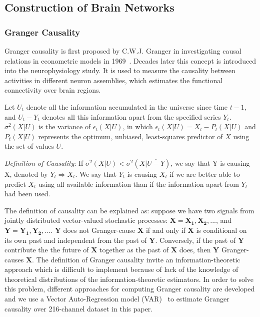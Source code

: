 \subsection{Construction of Brain Networks}
\subsubsection{Granger Causality}
Granger causality is first proposed by C.W.J. Granger in investigating causal relations in econometric models in 1969~\cite{granger1969investigating}. Decades later this concept is introduced into the neurophysiology study. It is used to measure the causality between activities in different neuron assemblies, which estimates the functional connectivity over brain regions. 

Let $U_t$ denote all the information accumulated in the universe since time $t-1$, and $U_t-Y_t$ denotes all this information apart from the specified series $Y_t$. $\sigma^2(X|U)$ is the variance of $\epsilon_t(X|U)$, in which $\epsilon_t(X|U)=X_t-P_t(X|U)$ and $P_t(X|U)$ represents the optimum, unbiased, least-squares predictor of $X$ using the set of values $U$.

\emph{Definition of Causality}: If $\sigma^2(X|U)<\sigma^2(X|\overline{U-Y})$, we say that Y is causing X, denoted by $Y_t \Rightarrow X_t$. We say that $Y_t$ is causing $X_t$ if we are better able to predict $X_t$ using all available information than if the information apart from $Y_t$ had been used.

The definition of causality can be explained as: suppose we have two signals from jointly distributed vector-valued stochastic processes: $\mathbf{X}=\mathbf{X_1}, \mathbf{X_2},...$, and $\mathbf{Y}=\mathbf{Y_1}, \mathbf{Y_2},...$. $\mathbf{Y}$ does not Granger-cause $\mathbf{X}$ if and only if $\mathbf{X}$ is conditional on its own past and independent from the past of $\mathbf{Y}$. Conversely, if the past of $\mathbf{Y}$ contribute the the future of $\mathbf{X}$ together as the past of $\mathbf{X}$ does, then $\mathbf{Y}$ Granger-causes $\mathbf{X}$. The definition of Granger causality invite an information-theoretic approach which is difficult to implement because of lack of the knowledge of theoretical distributions of the information-theoretic estimators. In order to solve this problem, different approaches for computing Granger causality are developed and we use a Vector Auto-Regression model (VAR)~\cite{barnett2014mvgc} to estimate Granger causality over 216-channel dataset in this paper.


